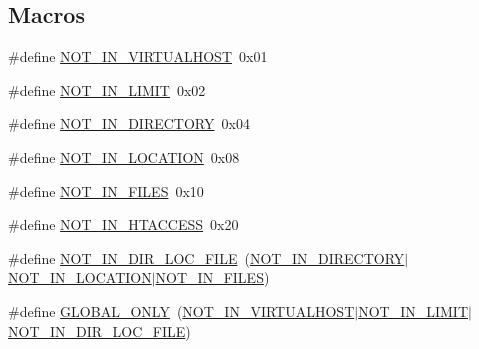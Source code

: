 \subsection*{Macros}
\begin{DoxyCompactItemize}
\item 
\#define \hyperlink{group__ap__check__cmd__context_ga319e4b6d3c0b0999ba0f2811a6e12682}{N\+O\+T\+\_\+\+I\+N\+\_\+\+V\+I\+R\+T\+U\+A\+L\+H\+O\+ST}~0x01
\item 
\#define \hyperlink{group__ap__check__cmd__context_ga719b0485f484e54e0f55f2abec186b49}{N\+O\+T\+\_\+\+I\+N\+\_\+\+L\+I\+M\+IT}~0x02
\item 
\#define \hyperlink{group__ap__check__cmd__context_ga6b31ec22c37df10b4375dcf474ad3b9a}{N\+O\+T\+\_\+\+I\+N\+\_\+\+D\+I\+R\+E\+C\+T\+O\+RY}~0x04
\item 
\#define \hyperlink{group__ap__check__cmd__context_gaec20d774050acd11912e6932d2df651e}{N\+O\+T\+\_\+\+I\+N\+\_\+\+L\+O\+C\+A\+T\+I\+ON}~0x08
\item 
\#define \hyperlink{group__ap__check__cmd__context_ga2b1d3b6335522897752643893ab5b83a}{N\+O\+T\+\_\+\+I\+N\+\_\+\+F\+I\+L\+ES}~0x10
\item 
\#define \hyperlink{group__ap__check__cmd__context_ga534fc327ccfb4bdde3f7a9cd10fb4c36}{N\+O\+T\+\_\+\+I\+N\+\_\+\+H\+T\+A\+C\+C\+E\+SS}~0x20
\item 
\#define \hyperlink{group__ap__check__cmd__context_gabad51f274f9ab135b90c360356d94cee}{N\+O\+T\+\_\+\+I\+N\+\_\+\+D\+I\+R\+\_\+\+L\+O\+C\+\_\+\+F\+I\+LE}~(\hyperlink{group__ap__check__cmd__context_ga6b31ec22c37df10b4375dcf474ad3b9a}{N\+O\+T\+\_\+\+I\+N\+\_\+\+D\+I\+R\+E\+C\+T\+O\+RY}$\vert$\hyperlink{group__ap__check__cmd__context_gaec20d774050acd11912e6932d2df651e}{N\+O\+T\+\_\+\+I\+N\+\_\+\+L\+O\+C\+A\+T\+I\+ON}$\vert$\hyperlink{group__ap__check__cmd__context_ga2b1d3b6335522897752643893ab5b83a}{N\+O\+T\+\_\+\+I\+N\+\_\+\+F\+I\+L\+ES})
\item 
\#define \hyperlink{group__ap__check__cmd__context_ga8f2f401b1d57a151c5ba871088ba097e}{G\+L\+O\+B\+A\+L\+\_\+\+O\+N\+LY}~(\hyperlink{group__ap__check__cmd__context_ga319e4b6d3c0b0999ba0f2811a6e12682}{N\+O\+T\+\_\+\+I\+N\+\_\+\+V\+I\+R\+T\+U\+A\+L\+H\+O\+ST}$\vert$\hyperlink{group__ap__check__cmd__context_ga719b0485f484e54e0f55f2abec186b49}{N\+O\+T\+\_\+\+I\+N\+\_\+\+L\+I\+M\+IT}$\vert$\hyperlink{group__ap__check__cmd__context_gabad51f274f9ab135b90c360356d94cee}{N\+O\+T\+\_\+\+I\+N\+\_\+\+D\+I\+R\+\_\+\+L\+O\+C\+\_\+\+F\+I\+LE})
\end{DoxyCompactItemize}

